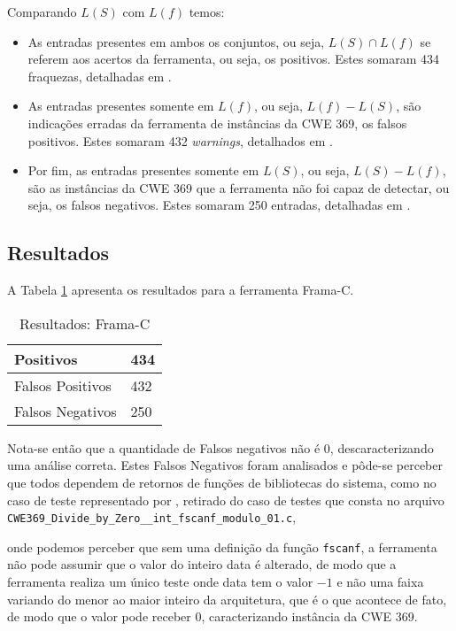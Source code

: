   Comparando $L(S)$ com $L(f)$ temos:

\begin{itemize}
  \item As entradas presentes em ambos os conjuntos, ou seja, $L(S) \cap L(f)$ se referem aos acertos da ferramenta, ou seja, os positivos. Estes somaram 434 fraquezas, detalhadas em .

  \item As entradas presentes somente em $L(f)$, ou seja, $L(f) - L(S)$, são indicações erradas da ferramenta de instâncias da CWE 369, os falsos positivos. Estes somaram 432 \textit{warnings}, detalhados em .

  \item Por fim, as entradas presentes somente em $L(S)$, ou seja, $L(S) - L(f)$, são as instâncias da CWE 369 que a ferramenta não foi capaz de detectar, ou seja, os falsos negativos. Estes somaram 250 entradas, detalhadas em .
\end{itemize}

  \subsection{Resultados}

A Tabela \ref{tabela_framac1} apresenta os resultados para a ferramenta Frama-C.
\begin{table}[h]
\caption{Resultados: Frama-C}
  \centering
\begin{tabular}{l | l}
  \hline
  Positivos & 434 \\ \hline
  Falsos Positivos & 432 \\ \hline
  Falsos Negativos & 250 \\
  \hline
\end{tabular}
\label{tabela_framac1}
\end{table}

Nota-se então que a quantidade de Falsos negativos não é 0, descaracterizando uma análise correta. Estes Falsos Negativos foram analisados e pôde-se perceber que todos dependem de retornos de funções de bibliotecas do sistema, como no caso de teste representado por , retirado do caso de testes que consta no arquivo \lstinline{CWE369_Divide_by_Zero__int_fscanf_modulo_01.c},
      
      onde podemos perceber que sem uma definição da função \lstinline{fscanf}, a ferramenta não pode assumir que o valor do inteiro data é alterado, de modo que a ferramenta realiza um único teste onde data tem o valor $-1$ e não uma faixa variando do menor ao maior inteiro da arquitetura, que é o que acontece de fato, de modo que o valor pode receber 0, caracterizando instância da CWE 369. 

